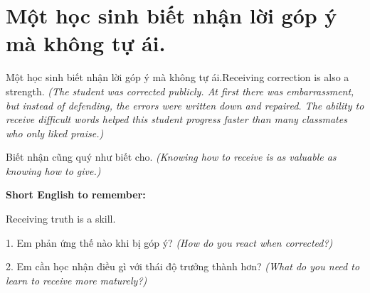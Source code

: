 \section{Một học sinh biết nhận lời góp ý mà không tự ái.}
\begin{truyen}{Một học sinh biết nhận lời góp ý mà không tự ái.}{Receiving correction is also a strength.}
\textit{(The student was corrected publicly. At first there was embarrassment, but instead of defending, the errors were written down and repaired. The ability to receive difficult words helped this student progress faster than many classmates who only liked praise.)}
\end{truyen}
\begin{baihoc}
Biết nhận cũng quý như biết cho.
\textit{(Knowing how to receive is as valuable as knowing how to give.)}
\end{baihoc}
\begin{ghinhoanh}
\textbf{Short English to remember:}

Receiving truth is a skill.
\end{ghinhoanh}
\begin{tuhocnhanh}
1. Em phản ứng thế nào khi bị góp ý? \textit{(How do you react when corrected?)}

2. Em cần học nhận điều gì với thái độ trưởng thành hơn? \textit{(What do you need to learn to receive more maturely?)}
\end{tuhocnhanh}
\ngancach

